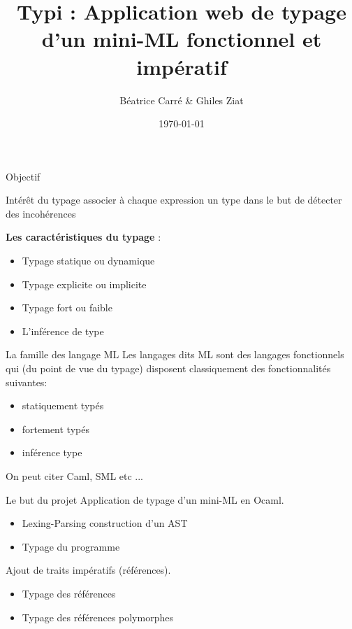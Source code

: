 \documentclass[xcolor={table,dvipsnames}]{beamer}
\title{Typi : Application web de typage d'un mini-ML fonctionnel et impératif}
\author{Béatrice Carré \& Ghiles Ziat}
\institute{Projet de Typage et Analyse Statique}
\date{\today}
\begin{document}
\maketitle







\begin{frame}{Objectif}


\begin{block}{Intérêt du typage}
associer à chaque expression un type dans le but de détecter des incohérences
\end{block}

\bigskip

\textbf{Les caractéristiques du typage} : 

  \begin{itemize}
  \item Typage statique ou dynamique
  \item Typage explicite ou implicite
  \item Typage fort ou faible
  \item L'inférence de type
  \end{itemize}


\end{frame}











\begin{frame}{La famille des langage ML}
Les langages dits ML sont des langages fonctionnels qui (du point de vue du typage) disposent classiquement des fonctionnalités suivantes:

\begin {itemize}
\item statiquement typés
\item fortement typés
\item inférence type 
\end {itemize}
\medskip
On peut citer Caml, SML etc ...
\end{frame}




\begin{frame}{Le but du projet}
Application de typage d'un mini-ML en Ocaml.
\begin{itemize}
\item Lexing-Parsing construction d'un AST 
\item Typage du programme
\end{itemize}
\bigskip

Ajout de traits impératifs (références).
\begin{itemize}
\item Typage des références
\item Typage des références polymorphes
\end{itemize}
\end{frame}
\end{document}
